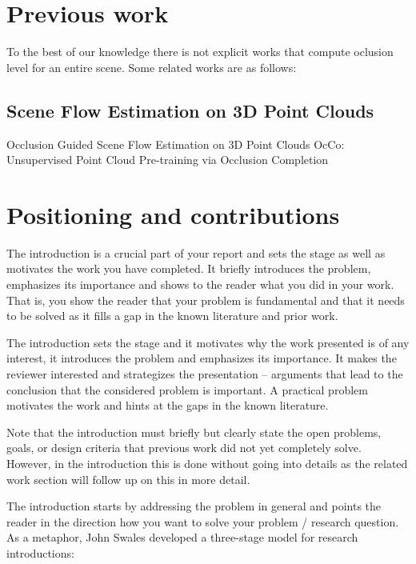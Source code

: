 \documentclass[11pt, a4paper,oneside,chapterprefix=false]{scrbook}
\begin{document}
\section{Previous work}
To the best of our knowledge there is not explicit works that compute oclusion level for an entire scene.
Some related works are as follows:

\subsection{Scene Flow Estimation on 3D Point Clouds}
Occlusion Guided Scene Flow Estimation on 3D Point Clouds
OcCo: Unsupervised Point Cloud Pre-training via Occlusion Completion

\section{Positioning and contributions}


The introduction is a crucial part of your report and sets the stage as well as motivates the work you have completed. It briefly introduces the problem, emphasizes its importance and shows to the reader what you did in your work. That is, you show the reader that your problem is fundamental and that it needs to be solved as it fills a gap in the known literature and prior work.

The introduction sets the stage and it motivates why the work presented is of any interest, it introduces the problem and emphasizes its importance. It makes the reviewer interested and strategizes the presentation -- arguments that lead to the conclusion that the considered problem is important. A practical problem motivates the work and hints at the gaps in the known literature.

Note that the introduction must briefly but clearly state the open problems, goals, or design criteria that previous work did not yet completely solve. However, in the introduction this is done without going into details as the related work section will follow up on this in more detail.

The introduction starts by addressing the problem in general and points the reader in the direction how you want to solve your problem / research question. As a metaphor, John Swales developed a three-stage model for research introductions: 
\end{document}
